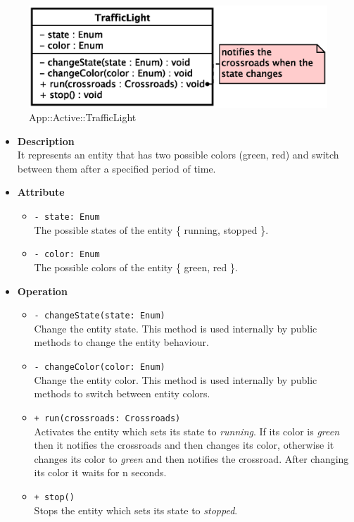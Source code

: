 \begin{figure}[h]
\centering
\includegraphics[scale=0.6,keepaspectratio]{images/solution/traffic_light.eps}
\caption{App::Active::TrafficLight}
\label{fig:sd-app-traffic-light}
\end{figure}
\begin{itemize}
  \item \textbf{Description} \\
    It represents an entity that has two possible colors (green, red) and switch
between them after a specified period of time.
  \item \textbf{Attribute}
  \begin{itemize}
    \item \texttt{- state: Enum} \\
The possible states of the entity \{ running, stopped \}.
    \item \texttt{- color: Enum} \\
The possible colors of the entity \{ green, red \}.
  \end{itemize}
  \item \textbf{Operation}
  \begin{itemize} 
    \item \texttt{- changeState(state: Enum)} \\
Change the entity state. This method is used internally by public methods to 
change the entity behaviour.
    \item \texttt{- changeColor(color: Enum)} \\
Change the entity color. This method is used internally by public methods to 
switch between entity colors.
    \item \texttt{+ run(crossroads: Crossroads)} \\
Activates the entity which sets its state to \textit{running}. If its color is 
\textit{green} then it notifies the crossroads and then changes its color, 
otherwise it changes its color to \textit{green} and then notifies 
the crossroad. After changing its color it waits for n seconds.    
    \item \texttt{+ stop()} \\
Stops the entity which sets its state to \textit{stopped}.
  \end{itemize}
\end{itemize}
